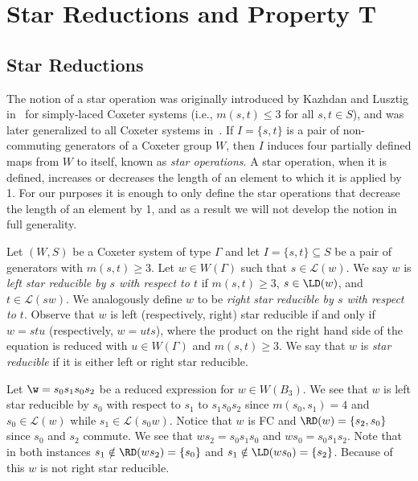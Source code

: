 \section{Star Reductions and Property T}

\subsection{Star Reductions}\label{sec:star}

The notion of a star operation was originally introduced by Kazhdan and Lusztig in~\cite{Kazhdan1979} for simply-laced Coxeter systems (i.e., $m(s,t) \leq 3$ for all $s,t \in S$), and was later generalized to all Coxeter systems in~\cite{Lusztig1985}. If $I=\{s,t\}$ is a pair of non-commuting generators of a Coxeter group $W$, then $I$ induces four partially defined maps from $W$ to itself, known as \emph{star operations}. A star operation, when it is defined, increases or decreases the length of an element to which it is applied by 1. For our purposes it is enough to only define the star operations that decrease the length of an element by 1, and as a result we will not develop the notion in full generality.

Let $(W,S)$ be a Coxeter system of type $\Gamma$ and let $I=\{s,t\}\subseteq S$ be a pair of generators with $m(s,t) \geq 3$. Let $w \in W(\Gamma)$ such that $s \in \mathcal{L}(w)$. We say $w$ is \emph{left star reducible by $s$ with respect to $t$} if $m(s,t) \geq 3$, $s \in \LD(w)$, and $t \in \mathcal{L}(sw)$. We analogously define $w$ to be \emph{right star reducible by $s$ with respect to $t$}. Observe that $w$ is left (respectively, right) star reducible if and only if $w=stu$ (respectively, $w=uts$), where the product on the right hand side of the equation is reduced with $u \in W(\Gamma)$ and $m(s,t) \geq 3$. We say that $w$ is \emph{star reducible} if it is either left or right star reducible.

\begin{example}\label{ex:starred}
Let $\w=s_0s_1s_0s_2$ be a reduced expression for $w \in W(B_3)$. We see that $w$ is left star reducible by $s_0$ with respect to $s_1$ to $s_1s_0s_2$ since $m(s_0,s_1)=4$ and $s_0 \in \mathcal{L}(w)$ while $s_1 \in \mathcal{L}(s_0w)$. Notice that $w$ is FC and $\RD(w)=\{s_2,s_0\}$ since $s_0$ and $s_2$ commute. We see that $ws_2=s_0s_1s_0$ and $ws_0=s_0s_1s_2$. Note that in both instances $s_1 \notin \RD(ws_2)=\{s_0\}$ and $s_1 \notin \LD(ws_0)=\{s_2\}$. Because of this $w$ is not right star reducible. 
\end{example}

